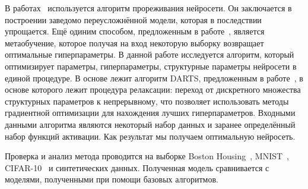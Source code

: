 \documentclass[12pt,twoside]{article}
\begin{document}
	В работах~\cite{cun1990, graves2011} используется алгоритм прореживания нейросети. Он заключается в построении заведомо переусложнённой модели, которая в последствии упрощается. Ещё одиним способом, предложенным в работе~\cite{Maclaurin:2015:GHO:3045118.3045343}, является метаобучение, которое получая на вход некоторую выборку возвращает оптимальные гиперпараметры.
	В данной работе исследуется алгоритм, который оптимизирует параметры, гиперпараметры, структурные параметры нейросети в единой процедуре. В основе лежит алгоритм DARTS, предложенным в работе~\cite{liu2018darts}, в основе которого лежит процедура релаксации: переход от дискретного множества структурных параметров к непрерывному, что позволяет использовать методы градиентной оптимизации для нахождения лучших гиперпараметров. Входными данными алгоритма являются некоторый набор данных и заранее определённый набор функций активации. Как результат мы получаем оптимальную нейросеть.
	
	Проверка и анализ метода проводится на выборке Boston Housing~\cite{Boston}, MNIST~\cite{MNIST},  CIFAR-10~\cite{CIFAR-10} и синтетических данных. Полученная модель сравнивается с моделями, полученными при помощи базовых алгоритмов.
	 



\end{document}
